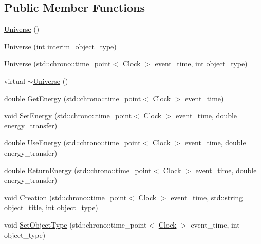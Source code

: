 \subsection*{Public Member Functions}
\begin{DoxyCompactItemize}
\item 
\mbox{\hyperlink{classUniverse_a4d137a146dd3c2514dfb692dfbab6984}{Universe}} ()
\item 
\mbox{\hyperlink{classUniverse_a1210ce56049f1fc67f53aeda223bb82b}{Universe}} (int interim\+\_\+object\+\_\+type)
\item 
\mbox{\hyperlink{classUniverse_a03af7455263d3028b55ca5dc93ebb6ba}{Universe}} (std\+::chrono\+::time\+\_\+point$<$ \mbox{\hyperlink{universe_8h_a0ef8d951d1ca5ab3cfaf7ab4c7a6fd80}{Clock}} $>$ event\+\_\+time, int object\+\_\+type)
\item 
virtual \mbox{\hyperlink{classUniverse_ad4d90f6f2727992762c6b409d3d3d228}{$\sim$\+Universe}} ()
\item 
double \mbox{\hyperlink{classUniverse_a3b25e7ce6552991b7d5e6a9eb6e8a7ff}{Get\+Energy}} (std\+::chrono\+::time\+\_\+point$<$ \mbox{\hyperlink{universe_8h_a0ef8d951d1ca5ab3cfaf7ab4c7a6fd80}{Clock}} $>$ event\+\_\+time)
\item 
void \mbox{\hyperlink{classUniverse_a868250e67d0fcb2483aa8bdd73c40a02}{Set\+Energy}} (std\+::chrono\+::time\+\_\+point$<$ \mbox{\hyperlink{universe_8h_a0ef8d951d1ca5ab3cfaf7ab4c7a6fd80}{Clock}} $>$ event\+\_\+time, double energy\+\_\+transfer)
\item 
double \mbox{\hyperlink{classUniverse_a63e878aaf03f1800b255e9a089a72a8b}{Use\+Energy}} (std\+::chrono\+::time\+\_\+point$<$ \mbox{\hyperlink{universe_8h_a0ef8d951d1ca5ab3cfaf7ab4c7a6fd80}{Clock}} $>$ event\+\_\+time, double energy\+\_\+transfer)
\item 
double \mbox{\hyperlink{classUniverse_aeda74e3902c0e56c0c09779854045cde}{Return\+Energy}} (std\+::chrono\+::time\+\_\+point$<$ \mbox{\hyperlink{universe_8h_a0ef8d951d1ca5ab3cfaf7ab4c7a6fd80}{Clock}} $>$ event\+\_\+time, double energy\+\_\+transfer)
\item 
void \mbox{\hyperlink{classUniverse_a28615baf47d4558cbe5eebeed6575024}{Creation}} (std\+::chrono\+::time\+\_\+point$<$ \mbox{\hyperlink{universe_8h_a0ef8d951d1ca5ab3cfaf7ab4c7a6fd80}{Clock}} $>$ event\+\_\+time, std\+::string object\+\_\+title, int object\+\_\+type)
\item 
void \mbox{\hyperlink{classUniverse_a2274a54fbdc7504c897e4272162bf17a}{Set\+Object\+Type}} (std\+::chrono\+::time\+\_\+point$<$ \mbox{\hyperlink{universe_8h_a0ef8d951d1ca5ab3cfaf7ab4c7a6fd80}{Clock}} $>$ event\+\_\+time, int object\+\_\+type)

\end{DoxyCompactItemize}
